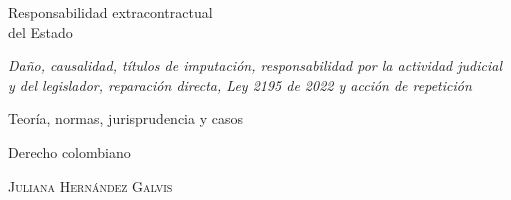 \documentclass[11pt,a4paper,twoside,openany]{book}
\begin{document}
\frontmatter
\begin{titlepage}\centering
\vspace*{3cm}{\large\scshape Manual}\par\vspace{1cm}
{\Huge Responsabilidad extracontractual\\[6pt] del Estado\par}\vspace{1cm}
{\itshape\large Daño, causalidad, títulos de imputación, responsabilidad por la actividad judicial y del legislador, reparación directa, Ley 2195 de 2022 y acción de repetición\par}\vfill
{\large Teoría, normas, jurisprudencia y casos\par Derecho colombiano\par}\vspace{1.5cm}
{\scshape\Large Juliana Hernández Galvis\par}\vspace{4pt}{\large Octubre de 2026\par}
\end{titlepage}
\tableofcontents

\mainmatter










\end{document}
